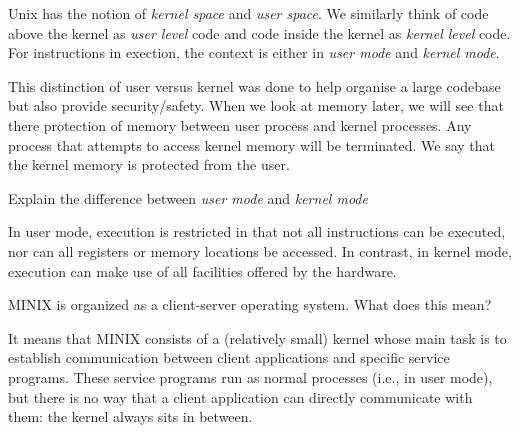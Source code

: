 Unix has the notion of \textit{kernel space} and \textit{user space}. 
We similarly think of code above the kernel as \textit{user level} code and 
code inside the kernel as \textit{kernel level} code.
For instructions in exection, the context is either in 
\textit{user mode} and \textit{kernel mode}.

This distinction of user versus kernel
 was done to help organise a large codebase but also provide security/safety.
When we look at memory later, we will see that there protection of 
memory between user process and kernel processes. Any process that attempts to access 
kernel memory will be terminated. We say that the kernel memory is protected from the user. 

\begin{example}
Explain the difference between \textit{user mode} and \textit{kernel mode}

In user mode, execution is restricted in that not all instructions can be executed, nor can all registers or memory locations be accessed. In contrast, in kernel mode, execution can make use of all facilities offered by the hardware.
\end{example}


\begin{example}
MINIX is organized as a client-server operating system. What does this mean?

It means that MINIX consists of a (relatively small) kernel whose main task is to establish communication between client applications and speciﬁc service programs. These service programs run
as normal processes (i.e., in user mode), but there is no way that a client application can directly
communicate with them: the kernel always sits in between.
\end{example}